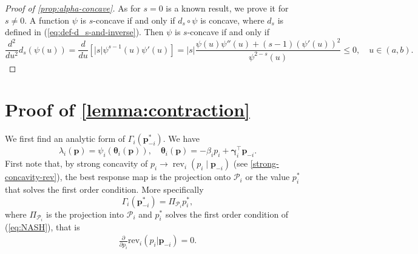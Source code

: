 \documentclass{article} %
\def\eqref#1{equation~\ref{#1}}
\renewcommand{\eqref}[1]{(\ref{#1})}
\begin{document}
\begin{proof}[Proof of \cref{prop:alpha-concave}]
As for $s=0$ is a known result, we prove it for $s \neq 0$. A function $\psi$ is $s$-concave if and only if $d_s \circ \psi$ is concave, where $d_s$ is defined in \eqref{eq:def-d_s-and-inverse}. Then $\psi$ is $s$-concave if and only if
$$
\frac{d^2}{d u^2} d_{s}(\psi(u)) = \frac{d}{d u} \left[|s|\psi^{s-1}(u)\psi'(u) \right]= |s|\frac{\psi(u)\psi''(u)+(s -1)(\psi'(u))^2}{\psi^{2-s}(u)} \leq 0, \quad u \in (a,b).
$$
\end{proof}

\section{Proof of \cref{lemma:contraction}}\label{app:UNE}
We first find an analytic form of $\Gamma_i(\mathbf{p}^{*}_{-i})$. We have 
$$
\lambda_i(\mathbf{p}) = \psi_i(\boldsymbol{\theta}_i(\mathbf{p})),\quad \boldsymbol{\theta}_i(\mathbf{p})=   -\beta_i p_i+\boldsymbol{\gamma}_i^{\top} \mathbf{p}_{-i}.
$$
First note that, by strong concavity of $p_i \to \operatorname{rev}_i(p_i \mid \mathbf{p}_{-i})$ (see \cref{strong-concavity-rev}), the best response map is the projection onto $\mathcal{P}_i$ or the value $p_i^*$ that solves the first order condition. More specifically 
$$
\Gamma_i(\mathbf{p}^{*}_{-i})=\Pi_{\mathcal{P}_i}p_i^*,
$$
where $\Pi_{\mathcal{P}_i}$ is the projection into $\mathcal{P}_i$ and $p_i^*$ solves the first order condition of \eqref{eq:NASH}, that is
\begin{align}\label{rev_deriv}
\frac{\partial}{\partial p_i} \mathrm{rev}_i(p_i | \mathbf{p}_{-i})=0.
\end{align}
\end{document}
